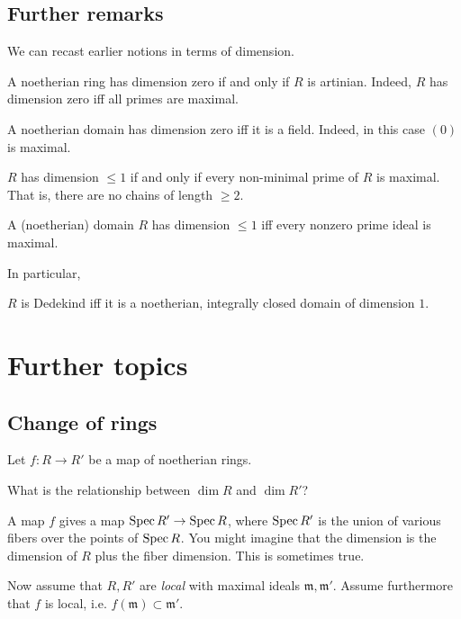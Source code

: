 \subsection{Further remarks}

We can recast earlier notions in terms of dimension.
\begin{remark} 
A noetherian ring has dimension zero if and only if $R$ is artinian. Indeed,
$R$ has dimension zero iff all primes are maximal.
\end{remark} 


\begin{remark} 
A noetherian domain has dimension zero iff it is a field. Indeed, in this case
$(0)$ is maximal.
\end{remark} 

\begin{remark} 
$R$ has dimension $\leq 1$ if and only if every non-minimal prime of $R$ is
maximal. That is, there are no chains of length $\geq 2$.
\end{remark} 

\begin{remark} 
A (noetherian) domain  $R$ has dimension $\leq 1$ iff every nonzero prime ideal
is maximal.
\end{remark} 

In particular,
\begin{proposition} 
$R$ is Dedekind iff it is a noetherian, integrally closed domain of dimension
$1$. 
\end{proposition} 


\section{Further topics}

\subsection{Change of rings}
Let $f: R \to R'$ be  a map of noetherian rings. 

\begin{question} 
What is the relationship between $\dim R$ and $\dim R'$?
\end{question} 

A map $f$ gives a map $\operatorname{Spec} R' \to \operatorname{Spec} R$, where $\operatorname{Spec} R'$ is the union
of various fibers over the points of $\operatorname{Spec} R$. You might imagine that the
dimension is the dimension of $R$ plus the fiber dimension. This is sometimes
true.

Now assume that $R, R'$ are \emph{local}  with maximal ideals $\mathfrak{m},
\mathfrak{m}'$. Assume furthermore that $f$ is local, i.e. $f(\mathfrak{m})
\subset \mathfrak{m}'$.

